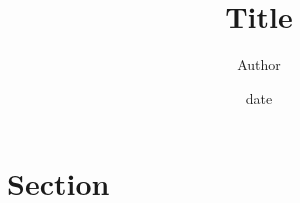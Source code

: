 \documentclass[11pt,a4paper]{article}
\author{Author}
\title{\textbf{Title}}
\date{date}
\begin{document}

\maketitle
\tableofcontents
\newpage

\section{Section}

% 
% 
\end{document}
